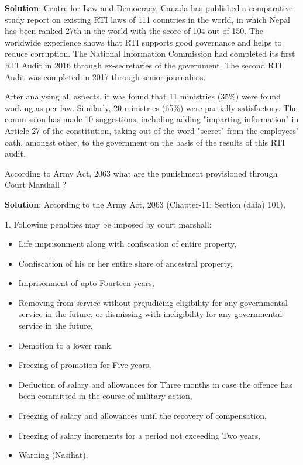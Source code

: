 \documentclass[
  openany]{book}
\newcommand{\question}{\item}
\newenvironment{solution}{ {\bfseries Solution}:}{}
\begin{document}
\begin{questions}
\begin{solution}
Centre for Law and Democracy, Canada has published a comparative study report on existing RTI laws of 111 countries in the world, in which Nepal has been ranked 27th in the world with the score of 104 out of 150. The worldwide experience shows that RTI supports good governance and helps to reduce corruption. The National Information Commission had completed its first RTI Audit in 2016 through ex-secretaries of the government. The second RTI Audit was completed in 2017 through senior journalists.

After analysing all aspects, it was found that 11 ministries (35\%) were found working as per law. Similarly, 20 ministries (65\%) were partially satisfactory. The commission has made 10 suggestions, including adding "imparting information" in Article 27 of the constitution, taking out of the word "secret" from the employees' oath, amongst other, to the government on the basis of the results of this RTI audit.

\end{solution}

\question According to Army Act, 2063 what are the punishment provisioned through Court Marshall ?

\begin{solution}
According to the Army Act, 2063 (Chapter-11; Section (dafa) 101), 

1. Following penalties may be imposed by court marshall:

\begin{itemize}
\item Life imprisonment along with confiscation of entire property,
\item Confiscation of his or her entire share of ancestral property,
\item Imprisonment of upto Fourteen years,
\item Removing from service without prejudicing eligibility for any governmental service in the future, or dismissing with ineligibility for any governmental service in the future,
\item Demotion to a lower rank,
\item Freezing of promotion for Five years,
\item Deduction of salary and allowances for Three months in case the offence has been committed in the course of military action,
\item Freezing of salary and allowances until the recovery of compensation,
\item Freezing of salary increments for a period not  exceeding Two years,
\item Warning (Nasihat).
\end{itemize}


\end{solution}
\end{questions}
\end{document}
